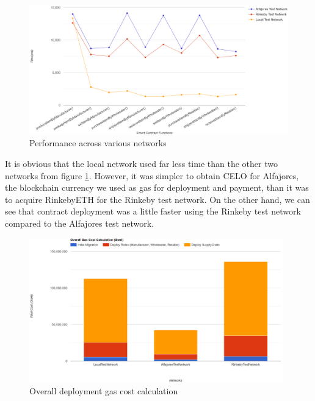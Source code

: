 \vspace{.5cm}

\begin{figure}[h]
\centering
  \includegraphics[width=15cm]{includes/figures/graph.png} 
  \caption{Performance across various networks}
  \label{Testing on networks}
\end{figure}

\vspace{.5cm}

It is obvious that the local network used far less time than the other two networks from figure \ref{Testing on networks}. However, it was simpler to obtain CELO for Alfajores, the blockchain currency we used as gas for deployment and payment, than it was to acquire RinkebyETH for the Rinkeby test network. On the other hand, we can see that contract deployment was a little faster using the Rinkeby test network compared to the Alfajores test network.


\begin{figure}[h]
\centering
  \includegraphics[width=11cm]{includes/figures/totalCost.png} 
  \caption{Overall deployment gas cost calculation }
  \label{Overall Gas Cost calculation}
\end{figure}

\vspace{.5cm}

